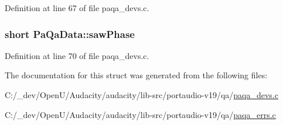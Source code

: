 Definition at line 67 of file paqa\+\_\+devs.\+c.

\subsubsection[{\texorpdfstring{saw\+Phase}{sawPhase}}]{\setlength{\rightskip}{0pt plus 5cm}short Pa\+Qa\+Data\+::saw\+Phase}\hypertarget{struct_pa_qa_data_ae99f5e5b17b941185f1fe0b9bb31860a}{}\label{struct_pa_qa_data_ae99f5e5b17b941185f1fe0b9bb31860a}


Definition at line 70 of file paqa\+\_\+devs.\+c.



The documentation for this struct was generated from the following files\+:\begin{DoxyCompactItemize}
\item 
C\+:/\+\_\+dev/\+Open\+U/\+Audacity/audacity/lib-\/src/portaudio-\/v19/qa/\hyperlink{paqa__devs_8c}{paqa\+\_\+devs.\+c}\item 
C\+:/\+\_\+dev/\+Open\+U/\+Audacity/audacity/lib-\/src/portaudio-\/v19/qa/\hyperlink{paqa__errs_8c}{paqa\+\_\+errs.\+c}\end{DoxyCompactItemize}
